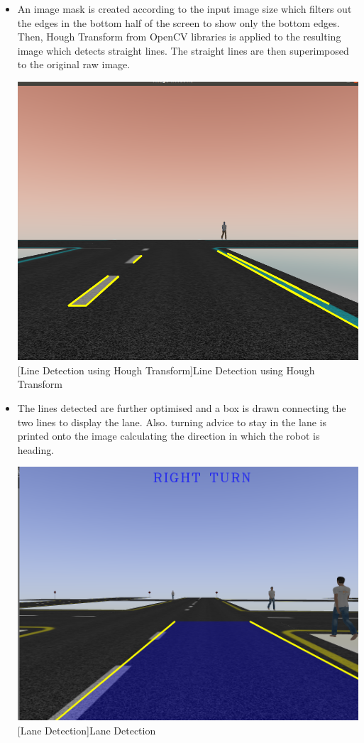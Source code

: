 \documentclass[%
xelatex,
	oneside,		%
	12pt,			%
	parskip=half,	%
	abstracton,
	chapterprefix=true%
    appendixprefix=true]
{scrbook}
\begin{document}
\begin{itemize}
\begin{center}
[Canny Edge Detection]{Canny Edge Detection}
\label{fig:canny}
\end{center}
\item An image mask is created according to the input image size which filters out the edges in the bottom half of the screen to show only the bottom edges. Then, Hough Transform from OpenCV libraries is applied to the resulting image which detects straight lines. The straight lines are then superimposed to the original raw image.
\begin{center}
\includegraphics[scale=0.3]{fig/hough.png}
[Line Detection using Hough Transform]{Line Detection using Hough Transform}
\label{fig:hough}
\end{center}
\item The lines detected are further optimised and a box is drawn connecting the two lines to display the lane. Also. turning advice to stay in the lane is printed onto the image calculating the direction in which the robot is heading.
\begin{center}
\includegraphics[scale=0.3]{fig/finaladas.png}
[Lane Detection]{Lane Detection}
\label{fig:lane}
\end{center}
	\end{itemize}
		
\end{document}
